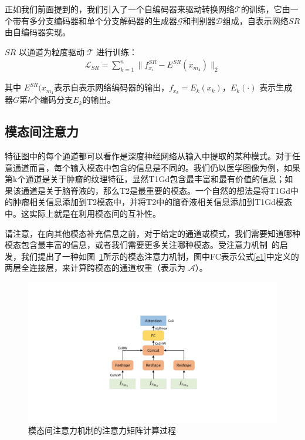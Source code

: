 正如我们前面提到的，我们引入了一个自编码器来驱动转换网络$\mathcal{T}$的训练，它由一个带有多分支编码器和单个分支解码器的生成器$\mathcal{G}$和判别器$\mathcal{D}$组成，自表示网络$SR$由自编码器实现。

$SR$ 以通道为粒度驱动 $\mathcal{T}$ 进行训练：
\begin{align}
	\mathcal{L}_{SR} = \sum_{k=1}^n \|f^{SR}_{x_i}- E^{SR}(x_{m_4})\|_2
\end{align}

其中 $E^{SR}(x_{m_4}$表示自表示网络编码器的输出，$f_{x_k}=E_k(x_k)$，$E_k(\cdot)$ 表示生成器$G$第$k$个编码分支$E_k$的输出。

\subsection{模态间注意力}

特征图中的每个通道都可以看作是深度神经网络从输入中提取的某种模式。对于任意通道而言，每个输入模态中包含的信息是不同的。我们仍以医学图像为例，如果第k个通道是关于肿瘤的纹理特征，显然T1Gd包含最丰富和最有价值的信息；如果该通道是关于脑脊液的，那么T2是最重要的模态。一个自然的想法是将T1Gd中的肿瘤相关信息添加到T2模态中，并将T2中的脑脊液相关信息添加到T1Gd模态中。这实际上就是在利用模态间的互补性。

请注意，在向其他模态补充信息之前，对于给定的通道或模式，我们需要知道哪种模态包含最丰富的信息，或者我们需要更多关注哪种模态。受注意力机制~\cite{seq2seq,attentionallyouneed,nonlocal,sagan}的启发，我们提出了一种如图~\ref{f2}所示的模态注意力机制，图中FC表示公式\ref{e1}中定义的两层全连接层，来计算跨模态的通道权重（表示为 $\mathcal{A}$）。

\begin{figure}
	\centering
	\includegraphics[width=0.8\columnwidth]{figures/JAGAN/20201109InterAttention_function_AV1_0.pdf}
	\caption[]{模态间注意力机制的注意力矩阵计算过程}
	\label{f2}
\end{figure}

